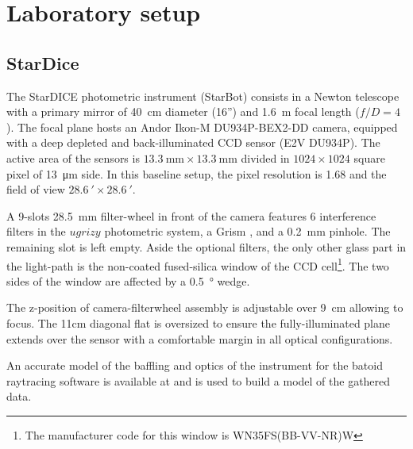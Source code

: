 \section{Laboratory setup}

\subsection{StarDice}
\label{sec:stardice}
The StarDICE photometric instrument (StarBot) consists in a Newton
telescope with a primary mirror of \SI{40}{\centi\meter} diameter
(16'') and \SI{1.6}{\meter} focal length ($f/D = 4$). The focal plane
hosts an Andor Ikon-M DU934P-BEX2-DD camera, equipped with a deep
depleted and back-illuminated CCD sensor (E2V DU934P). The active area
of the sensors is
$\SI{13.3}{\milli\meter}\times\SI{13.3}{\milli\meter}$ divided in
$1024\times 1024$ square pixel of \SI{13}{\micro\meter} side. In this
baseline setup, the pixel resolution is \SI{1.68}{\arcsec} and the
field of view $\SI{28.6}{\arcmin}\times\SI{28.6}{\arcmin}$.

A 9-slots \SI{28.5}{\milli\meter} filter-wheel in front of the camera
features 6 interference filters in the $ugrizy$ photometric system, a
Grism , and a \SI{0.2}{\milli\meter}
pinhole. The remaining slot is left empty. Aside the optional filters,
the only other glass part in the light-path is the non-coated
fused-silica window of the CCD cell\footnote{The manufacturer code
  for this window is WN35FS(BB-VV-NR)W}. The two sides of the window
are affected by a \SI{0.5}{\degree} wedge.

The z-position of camera-filterwheel assembly is adjustable over \SI{9}{\centi\meter} allowing to focus. The 11cm diagonal flat is oversized to ensure the fully-illuminated
plane extends over the sensor with a comfortable margin in all optical
configurations.

An accurate model of the baffling and optics of the instrument for the
batoid \cite{} raytracing software is available at  and
is used to build a model of the gathered data.  

